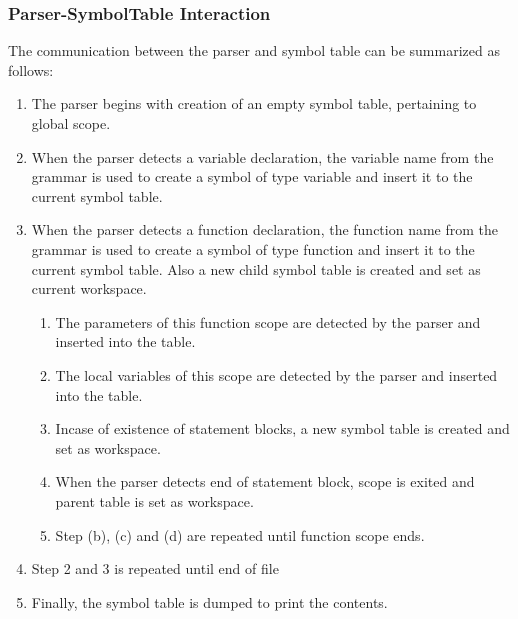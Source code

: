 \documentclass[12pt]{article}
\begin{document}
\subsubsection{Parser-SymbolTable Interaction}
\label{FS}
The communication between the parser and symbol table can be summarized as follows:
\begin{enumerate}
\item The parser begins with creation of an empty symbol table, pertaining to global scope.
\item When the parser detects a variable declaration, the variable name from the grammar is used to create a symbol of type variable and insert it to the current symbol table.
\item  When the parser detects a function declaration, the function name from the grammar is used to create a symbol of type function and insert it to the current symbol table. Also a new child symbol table is created and set as current workspace.
\begin{enumerate}
\item The parameters of this function scope are detected by the parser and inserted into the table.
\item The local variables of this scope are detected by the parser and inserted into the table.
\item Incase of existence of statement blocks, a new symbol table is created and set as workspace. 
\item When the parser detects end of statement block, scope is exited and parent table is set as workspace.
\item Step (b), (c) and (d) are repeated until function scope ends.
\end{enumerate}
\item Step 2 and 3 is repeated until end of file
\item Finally, the symbol table is dumped to print the contents.
\end{enumerate}
\end{document}
